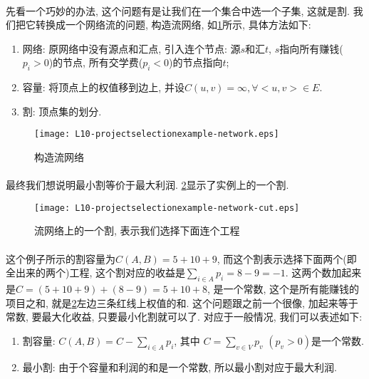             \paragraph{}先看一个巧妙的办法, 这个问题有是让我们在一个集合中选一个子集, 这就是割. 我们把它转换成一个网络流的问题, 构造流网络, 如\figurename\ref{Figure: project_selection_example_network}所示, 具体方法如下:
            \begin{enumerate}
 \item 网络: 原网络中没有源点和汇点, 引入连个节点: 源$s$和汇$t$, $s$指向所有赚钱($p_i > 0$)的节点, 所有交学费($p_i < 0$)的节点指向$t$;
 \item 容量: 将顶点上的权值移到边上, 并设$C(u,v)=\infty , \forall <u,v>\in E$.
 \item 割: 顶点集的划分.
            \end{enumerate}
            \begin{figure}[h]
                \centering
                \texttt{[image: L10-projectselectionexample-network.eps]}
                \caption{构造流网络}
                \label{Figure: project_selection_example_network}
            \end{figure}

            \paragraph{}最终我们想说明最小割等价于最大利润. \figurename\ref{Figure: project_selection_example_network_cut}显示了实例上的一个割.
            \begin{figure}[h]
                \centering
                \texttt{[image: L10-projectselectionexample-network-cut.eps]}
                \caption{流网络上的一个割, 表示我们选择下面连个工程}
                \label{Figure: project_selection_example_network_cut}
            \end{figure}
            \paragraph{}这个例子所示的割容量为$C(A,B) = 5 + 10 + 9$, 而这个割表示选择下面两个(即全出来的两个)工程, 这个割对应的收益是$ \sum_{i \in A} p_i = 8 - 9 = -1 $. 这两个数加起来是$C = (5 + 10 + 9) + (8 - 9) = 5 + 10 + 8$, 是一个常数, 这个是所有能赚钱的项目之和, 就是\figurename\ref{Figure: project_selection_example_network_cut}左边三条红线上权值的和. 这个问题跟之前一个很像, 加起来等于常数, 要最大化收益, 只要最小化割就可以了. 对应于一般情况, 我们可以表述如下:
            \begin{enumerate}
 \item 割容量: $C(A,B) = C - \sum_{i \in A} p_i$, 其中 $C=\sum_{v\in V} p_v $ $(p_v > 0)$是一个常数.
  \item 最小割: 由于个容量和利润的和是一个常数, 所以最小割对应于最大利润.
            \end{enumerate}
